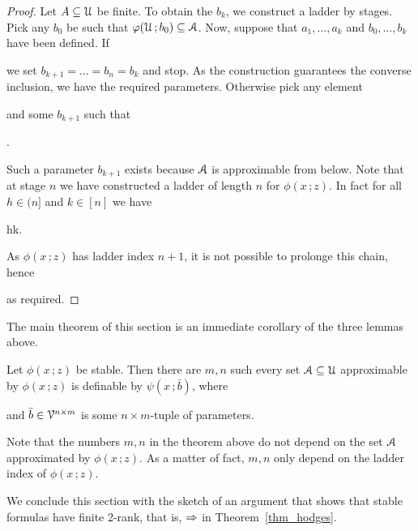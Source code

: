 \documentclass[scombinatorics.tex]{subfiles}
\begin{document}
\begin{proof}
  Let $A\subseteq\EuScript U$ be finite.
  To obtain the $b_k$, we construct a ladder by stages.
  Pick any $b_0$ be such that $\varphi(\EuScript U\,;b_0)\subseteq\EuScript A$.
  Now, suppose that $a_1,\dots,a_k$ and $b_0,\dots,b_k$ have been defined.
  If 
  \\[-1ex]

  we set $b_{k+1}=\dots=b_n=b_k$ and stop.
  As the construction guarantees the converse inclusion, we have the required parameters.
  Otherwise pick any element


  and some $b_{k+1}$ such that

  .

  Such a parameter $b_{k+1}$ exists because $\EuScript A$ is approximable from below.
  Note that at stage $n$ we have constructed a ladder of length $n$ for $\phi(x\,;z)$.
  In fact for all $h\in(n]$ and $k\in[n]$ we have
  
  {\IFF}
  {h\le k.}
  
  As $\phi(x\,;z)$ has ladder index $n+1$, it is not possible to prolonge this chain, hence


  as required.
\end{proof}
  
The main theorem of this section is an immediate corollary of the three lemmas above.

\begin{theorem}\label{thm_stable_definability}
  Let $\phi(x\,;z)$ be stable.
  Then there are $m, n$ such every set $\EuScript A\subseteq\EuScript U$ approximable by $\phi(x\,;z)$ is definable by $\psi(x\,;\bar b)$, where

  
  and $\bar b\in\EuScript V^{n\times m}$ is some $n{\times}m$-tuple of parameters.\QED
\end{theorem}

Note that the numbers $m,n$ in the theorem above do not depend on the set $\EuScript A$ approximated by $\phi(x\,;z)$. As a matter of fact, $m,n$ only depend on the ladder index of $\phi(x\,;z)$.

We conclude this section with the sketch of an argument that shows that stable formulas have finite 2-rank, that is, $\Rightarrow$ in Theorem~\ref{thm_hodges}.
\end{document}

